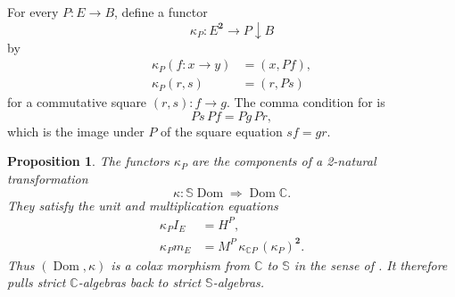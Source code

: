 \documentclass[11pt]{article}
\theoremstyle{plain}
\newtheorem{proposition}[theorem]{Proposition}
\theoremstyle{definition}
\theoremstyle{remark}
\newcommand{\Dom}{\operatorname{Dom}}
\newcommand{\C}{\mathbb{C}}
\newcommand{\Sq}{\mathbb{S}}
\numberwithin{equation}{section}
\begin{document}
For every $P\colon E\to B$, define a functor
\begin{equation}
\kappa_P\colon E^{\mathbf 2}\longrightarrow P\!\downarrow\!B
  \label{eq:kappa}
\end{equation}
by
\begin{align}
  \kappa_P(f\colon x\to y)&=(x,Pf),
  \label{eq:kappa-object}\\
  \kappa_P(r,s)&=(r,Ps)
  \label{eq:kappa-arrow}
\end{align}
for a commutative square $(r,s)\colon f\to g$.  The comma condition
for  is
\begin{equation*}
Ps\,Pf=Pg\,Pr,
\end{equation*}
which is the image under $P$ of the square equation $sf=gr$.

\begin{samepage}
\begin{proposition}\label{prop:kappa-monad-comparison}
The functors $\kappa_P$ are the components of a 2-natural
transformation
\begin{equation}
\kappa\colon\Sq\Dom\Longrightarrow\Dom\C.
  \label{eq:kappa-transformation}
\end{equation}
They satisfy the unit and multiplication equations
\begin{align}
  \kappa_P I_E&=H^{P},
  \label{eq:kappa-unit}\\
  \kappa_P m_E
  &=M^{P}\,\kappa_{\C P}\,(\kappa_P)^{\mathbf 2}.
  \label{eq:kappa-multiplication}
\end{align}
Thus $(\Dom,\kappa)$ is a colax morphism from $\C$ to $\Sq$ in the
sense of .  It therefore pulls strict
$\C$-algebras back to strict $\Sq$-algebras.
\end{proposition}
\end{samepage}
\end{document}
